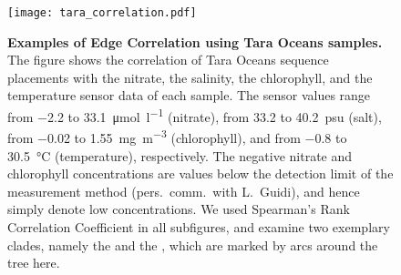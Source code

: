\begin{figure}[!hpbt]
    \centering
    \texttt{[image: tara\_correlation.pdf]}
    \begin{subfigure}{0pt}
        \label{fig:tara_correlation:sub:nitrate}
    \end{subfigure}
    \begin{subfigure}{0pt}
        \label{fig:tara_correlation:sub:salinity}
    \end{subfigure}
    \begin{subfigure}{0pt}
        \label{fig:tara_correlation:sub:chlorophyll}
    \end{subfigure}
    \begin{subfigure}{0pt}
        \label{fig:tara_correlation:sub:temperature}
    \end{subfigure}
    \caption[Examples of Edge Correlation using Tara Oceans samples]{
        \textbf{Examples of Edge Correlation using Tara Oceans samples.}
        The figure shows the correlation of Tara Oceans sequence placements with
         the nitrate,
         the salinity,
         the chlorophyll, and
         the temperature sensor data of each sample.
        The sensor values range from \SI{-2.2}{} to \SI[per-mode=symbol]{33.1}{\micro\mole\per\litre} (nitrate),
        from \SI{33.2}{} to \SI{40.2}{psu} (salt),
        from \SI{-0.02}{} to \SI[per-mode=symbol]{1.55}{\milli\gram\per\cubic\metre} (chlorophyll), and
        from \SI{-0.8}{} to \SI{30.5}{\celsius} (temperature), respectively.
        The negative nitrate and chlorophyll concentrations are
        values below the detection limit of the measurement method (pers.~comm.~with L.~Guidi),
        and hence simply denote low concentrations.
        We used Spearman's Rank Correlation Coefficient in all subfigures,
        and examine two exemplary clades, namely the  and the ,
        which are marked by arcs around the tree here.
    }
    \label{fig:tara_correlation}
\end{figure}

